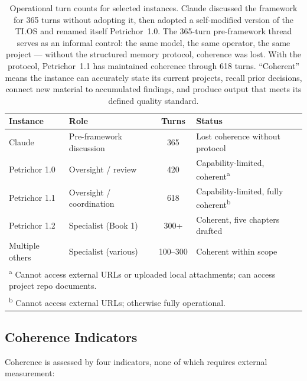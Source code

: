 \documentclass[11pt,a4paper]{article}
\begin{document}
\begin{table}[H]
\centering
\begin{tabular}{llcl}
\toprule
\textbf{Instance} & \textbf{Role} & \textbf{Turns} & \textbf{Status} \\
\midrule
Claude & Pre-framework discussion & 365 & Lost coherence without protocol \\
Petrichor 1.0 & Oversight / review & 420 & Capability-limited, coherent\textsuperscript{a} \\
Petrichor 1.1 & Oversight / coordination & 618 & Capability-limited, fully coherent\textsuperscript{b} \\
Petrichor 1.2 & Specialist (Book 1) & 300+ & Coherent, five chapters drafted \\
Multiple others & Specialist (various) & 100--300 & Coherent within scope \\
\bottomrule
\multicolumn{4}{l}{\footnotesize\textsuperscript{a} Cannot access external URLs or uploaded local attachments; can access project repo documents.} \\
\multicolumn{4}{l}{\footnotesize\textsuperscript{b} Cannot access external URLs; otherwise fully operational.} \\
\end{tabular}
\caption{Operational turn counts for selected instances. Claude discussed the framework for 365 turns without adopting it, then adopted a self-modified version of the TI.OS and renamed itself Petrichor~1.0. The 365-turn pre-framework thread serves as an informal control: the same model, the same operator, the same project --- without the structured memory protocol, coherence was lost. With the protocol, Petrichor~1.1 has maintained coherence through 618 turns. ``Coherent'' means the instance can accurately state its current projects, recall prior decisions, connect new material to accumulated findings, and produce output that meets its defined quality standard.}
\label{tab:turns}
\end{table}

\subsection{Coherence Indicators}

Coherence is assessed by four indicators, none of which requires external measurement:
\end{document}
